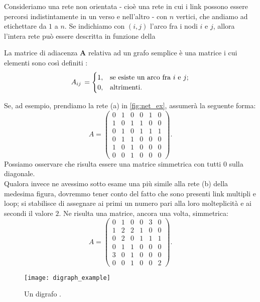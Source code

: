 Consideriamo una rete non orientata - cioè una rete in cui i link possono essere percorsi indistintamente in un verso e nell'altro - con $ n $ vertici, che andiamo ad etichettare da $ 1 $ a $ n $. Se indichiamo con $ \left( i, j \right) $ l'arco fra i nodi $ i $ e $ j $, allora l'intera rete può essere descritta in funzione della
\begin{definizione}
La matrice di adiacenza \textbf{A} relativa ad un grafo semplice è una matrice i cui elementi sono così definiti \cite{Newman}:
\[
A_{ij} \, =
\begin{cases}
1, & \text{se esiste un arco fra $ i $ e $ j $};\\ 
0, & \text{altrimenti}.
\end{cases}
\]
\end{definizione}
Se, ad esempio, prendiamo la rete (a) in \cref{fig:net_ex}, assumerà la seguente forma:
\begin{equation}
A =
\begin{pmatrix}
0 & 1 & 0 & 0 & 1 & 0 \\
1 & 0 & 1 & 1 & 0 & 0 \\
0 & 1 & 0 & 1 & 1 & 1 \\
0 & 1 & 1 & 0 & 0 & 0 \\
1 & 0 & 1 & 0 & 0 & 0 \\
0 & 0 & 1 & 0 & 0 & 0
\end{pmatrix} .
\end{equation}
Possiamo osservare che risulta essere una matrice simmetrica con tutti $ 0 $ sulla diagonale. 
\\Qualora invece ne avessimo sotto esame una più simile alla rete (b) della medesima figura, dovremmo tener conto del fatto che sono presenti link multipli e loop; si stabilisce di assegnare ai primi un numero pari alla loro molteplicità e ai secondi il valore $ 2 $. Ne risulta una matrice, ancora una volta, simmetrica:
\begin{equation}
A =
\begin{pmatrix}
0 & 1 & 0 & 0 & 3 & 0 \\
1 & 2 & 2 & 1 & 0 & 0 \\
0 & 2 & 0 & 1 & 1 & 1 \\
0 & 1 & 1 & 0 & 0 & 0 \\
3 & 0 & 1 & 0 & 0 & 0 \\
0 & 0 & 1 & 0 & 0 & 2
\end{pmatrix} .
\end{equation}


\begin{wrapfigure}{l}{0.4\textwidth}
		\texttt{[image: digraph\_example]}
		\caption{Un digrafo \cite{Newman}.}
		\label{fig:dig_ex}
\end{wrapfigure}

